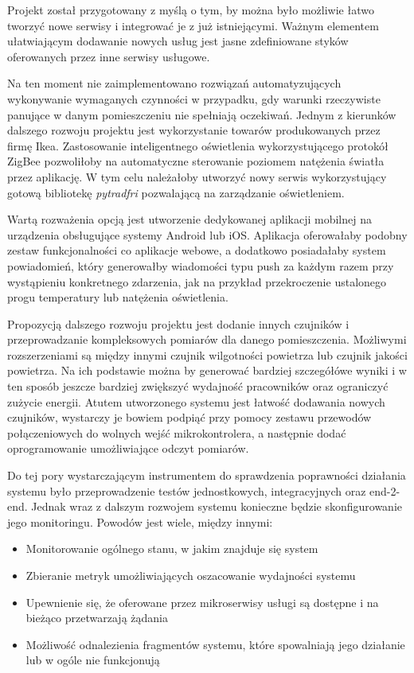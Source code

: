 Projekt został przygotowany z myślą o tym, by można było możliwie łatwo tworzyć nowe 
serwisy i integrować je z już istniejącymi. Ważnym elementem ułatwiającym dodawanie 
nowych usług jest jasne zdefiniowane styków oferowanych przez inne serwisy usługowe. 

Na ten moment nie zaimplementowano rozwiązań automatyzujących wykonywanie wymaganych 
czynności w przypadku, gdy warunki rzeczywiste panujące w danym pomieszczeniu nie 
spełniają oczekiwań. Jednym z kierunków dalszego rozwoju projektu jest wykorzystanie 
towarów produkowanych przez firmę Ikea. Zastosowanie inteligentnego oświetlenia 
wykorzystującego protokół ZigBee pozwoliłoby na automatyczne sterowanie poziomem 
natężenia światła przez aplikację. W tym celu należałoby utworzyć nowy serwis 
wykorzystujący gotową bibliotekę \textit{pytradfri} \cite{ikea2022}
pozwalającą na zarządzanie oświetleniem.

Wartą rozważenia opcją jest utworzenie dedykowanej aplikacji mobilnej na urządzenia
obsługujące systemy Android lub iOS. Aplikacja oferowałaby podobny zestaw funkcjonalności
co aplikacje webowe, a dodatkowo posiadałaby system powiadomień, który generowałby
wiadomości typu push za każdym razem przy wystąpieniu konkretnego zdarzenia, jak na 
przykład przekroczenie ustalonego progu temperatury lub natężenia oświetlenia.

Propozycją dalszego rozwoju projektu jest dodanie innych czujników i przeprowadzanie
kompleksowych pomiarów dla danego pomieszczenia. Możliwymi rozszerzeniami są między
innymi czujnik wilgotności powietrza lub czujnik jakości powietrza. Na ich podstawie
można by generować bardziej szczegółówe wyniki i w ten sposób jeszcze bardziej
zwiększyć wydajność pracowników oraz ograniczyć zużycie energii. Atutem utworzonego
systemu jest łatwość dodawania nowych czujników, wystarczy je bowiem podpiąć 
przy pomocy zestawu przewodów połączeniowych do wolnych wejść mikrokontrolera, a następnie dodać
oprogramowanie umożliwiające odczyt pomiarów. 

Do tej pory wystarczającym instrumentem do sprawdzenia poprawności działania systemu
było przeprowadzenie testów jednostkowych, integracyjnych oraz end-2-end. Jednak
wraz z dalszym rozwojem systemu konieczne będzie skonfigurowanie jego monitoringu.
Powodów jest wiele, między innymi:

\begin{itemize}
    \item Monitorowanie ogólnego stanu, w jakim znajduje się system
    \item Zbieranie metryk umożliwiających oszacowanie wydajności systemu
    \item Upewnienie się, że oferowane przez mikroserwisy usługi są dostępne i na bieżąco przetwarzają żądania
    \item Możliwość odnalezienia fragmentów systemu, które spowalniają jego działanie
    lub w ogóle nie funkcjonują
\end{itemize}

